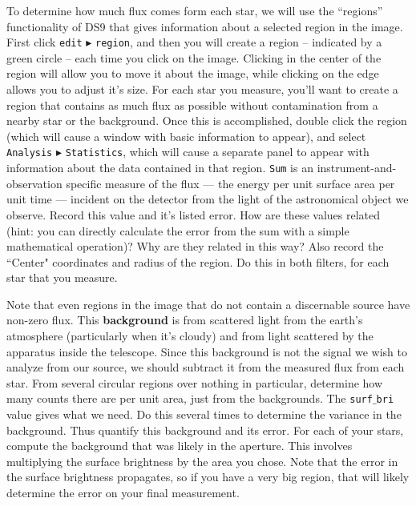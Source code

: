 To determine how much flux comes form each star, we will use the ``regions'' functionality of DS9 that gives information about a selected region in the image. First click \texttt{edit} $\blacktriangleright$ \texttt{region}, and then you will create a region -- indicated by a green circle -- each time you click on the image. Clicking in the center of the region will allow you to move it about the image, while clicking on the edge allows you to adjust it's size. For each star you measure, you'll want to create a region that contains as much flux as possible without contamination from a nearby star or the background. Once this is accomplished, double click the region (which will cause a window with basic information to appear), and select \texttt{Analysis} $\blacktriangleright$ \texttt{Statistics}, which will cause a separate panel to appear with information about the data contained in that region. \texttt{Sum} is an instrument-and-observation specific measure of the flux --- the energy per unit surface area per unit time --- incident on the detector from the light of the astronomical object we observe. Record this value and it's listed error. How are these values related (hint: you can directly calculate the error from the sum with a simple mathematical operation)? Why are they related in this way? Also record the ``Center" coordinates and radius of the region. Do this in both filters, for each star that you measure.


Note that even regions in the image that do not contain a discernable source have non-zero flux. This \textbf{background} is from scattered light from the earth's atmosphere (particularly when it's cloudy) and from light scattered by the apparatus inside the telescope. Since this background is not the signal we wish to analyze from our source, we should subtract it from the measured flux from each star. From several circular regions over nothing in particular, determine how many counts there are per unit area, just from the backgrounds.  The \texttt{surf$\_$bri} value gives what we need.  Do this several times to determine the variance in the background.  Thus quantify this background and its error. For each of your stars, compute the background that was likely in the aperture.  This involves multiplying the surface brightness by the area you chose.  Note that the error in the surface brightness propagates, so if you have a very big region, that will likely determine the error on your final measurement. 

